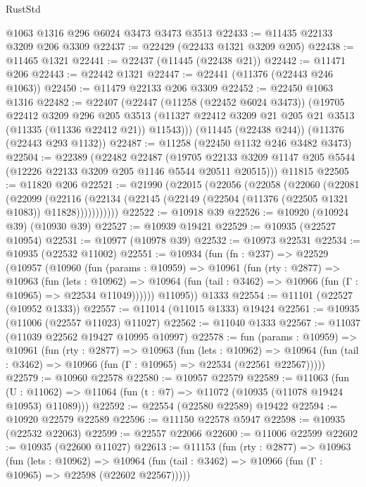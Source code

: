 \begin{lexlean}{RustStd}
\begin{coremodule}
{\begin{coremodule}
{{{{{{{{{{{{{{{{{{{{{{{{{{{{{{{{{{{{{{{{{{{{{{{{{{{{{{{{{{{{{{{{{{{{{{{{{{{{{{{{{{{{{    @1063
    @1316
    @296
    @6024
    @3473
    @3473
    @3513
@22433 := @11435 @22133 @3209 @206 @3309
@22437 := @22429 (@22433 @1321 @3209 @205)
@22438 := @11465 @1321
@22441 := @22437 (@11445 (@22438 @21))
@22442 := @11471 @206
@22443 := @22442 @1321
@22447 := @22441 (@11376 (@22443 @246 @1063))
@22450 := @11479 @22133 @206 @3309
@22452 := @22450 @1063 @1316
@22482 := @22407
    (@22447
      (@11258 (@22452 @6024 @3473))
      (@19705
        @22412
        @3209
        @296
        @205
        @3513
        (@11327 @22412 @3209 @21 @205 @21 @3513 (@11335 (@11336 @22412 @21)) @11543)))
    (@11445 (@22438 @244))
    (@11376 (@22443 @293 @1132))
@22487 := @11258 (@22450 @1132 @246 @3482 @3473)
@22504 := @22389
    (@22482
      @22487
      (@19705 @22133 @3209 @1147 @205 @5544 (@12226 @22133 @3209 @205 @1146 @5544 @20511 @20515)))
    @11815
@22505 := @11820 @206
@22521 := @21990
    (@22015
      (@22056
        (@22058
          (@22060
            (@22081
              (@22099
                (@22116
                  (@22134 (@22145 (@22149 (@22504 (@11376 (@22505 @1321 @1083)) @11828)))))))))))
@22522 := @10918 @39
@22526 := @10920 (@10924 @39) (@10930 @39)
@22527 := @10939 @19421
@22529 := @10935 (@22527 @10954)
@22531 := @10977 (@10978 @39)
@22532 := @10973 @22531
@22534 := @10935 (@22532 @11002)
@22551 := @10934
    (fun (fn : @237) =>
    @22529
      (@10957
        (@10960
          (fun (params : @10959) =>
          @10961
            (fun (rty : @2877) =>
            @10963
              (fun (lets : @10962) =>
              @10964 (fun (tail : @3462) => @10966 (fun (Γ : @10965) => @22534 @11049))))))
        @11095))
    @1333
@22554 := @11101 (@22527 (@10952 @1333))
@22557 := @11014 (@11015 @1333) @19424
@22561 := @10935 (@11006 (@22557 @11023) @11027)
@22562 := @11040 @1333
@22567 := @11037 (@11039 @22562 @19427 @10995 @10997)
@22578 := fun (params : @10959) =>
  @10961
    (fun (rty : @2877) =>
    @10963
      (fun (lets : @10962) =>
      @10964 (fun (tail : @3462) => @10966 (fun (Γ : @10965) => @22534 (@22561 @22567)))))
@22579 := @10960 @22578
@22580 := @10957 @22579
@22589 := @11063
    (fun (U : @11062) => @11064 (fun (t : @7) => @11072 (@10935 (@11078 @19424 @10953) @11089)))
@22592 := @22554 (@22580 @22589) @19422
@22594 := @10920 @22579 @22589
@22596 := @11150 @22578 @5947
@22598 := @10935 (@22532 @22063)
@22599 := @22557 @22066
@22600 := @11006 @22599
@22602 := @10935 (@22600 @11027)
@22613 := @11153
    (fun (rty : @2877) =>
    @10963
      (fun (lets : @10962) =>
      @10964 (fun (tail : @3462) => @10966 (fun (Γ : @10965) => @22598 (@22602 @22567)))))
}}}}}}}}}}}}}}}}}}}}}}}}}}}}}}}}}}}}}}}}}}}}}}}}}}}}}}}}}}}}}}}}}}}}}}}}}}}}}}}}}}}}}
\end{coremodule}}
\end{coremodule}
\end{lexlean}
